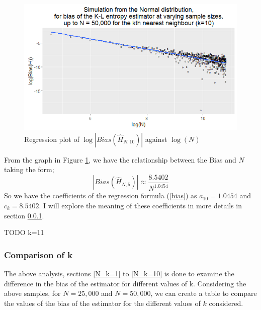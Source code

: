 \documentclass{article}
\begin{document}
\begin{figure}
  \begin{center}
    \includegraphics[width=\textwidth]{./Graphs/new_normal_k=10.png}
  \end{center}
\caption{Regression plot of $\log|Bias(\hat{H}_{N, 10})|$ against $\log(N)$}
  \label{normal_k=10_graph}
\end{figure}

From the graph in Figure \ref{normal_k=10_graph}, we have the relationship between the Bias and $N$ taking the form;
\begin{equation}
|Bias(\hat{H}_{N, 5})| \approx \frac{8.5402}{N^{1.0454}} \nonumber
\end{equation}
So we have the coefficients of the regression formula (\ref{bias}) as $a_{10} = 1.0454$ and $c_{k} = 8.5402$. I will explore the meaning of these coefficients in more details in section \ref{N_compare_k}.



TODO
k=11


\subsubsection{Comparison of k} \label{N_compare_k}
The above analysis, sections \ref{N_k=1} to \ref{N_k=10} is done to examine the difference in the bias of the estimator for different values of k. Considering the above samples, for $N=25,000$ and $N=50,000$, we can create a table to compare the values of the bias of the estimator for the different values of $k$ considered.
\end{document}
